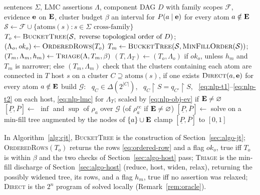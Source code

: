 \documentclass{article} %
\newcommand{\lo}{\underline}
\newcommand{\hi}{\overline}
\newcommand{\atoms}{\mathrm{atoms}}
\newcommand{\restr}{\!\restriction\!}
\newcommand{\readoff}{\rho}
\providecommand{\readoffcc}{\readoff^{\mathrm{cc}}}
\begin{document}
\begin{algorithm}[t]
\caption{\textsc{CJT}: marginal bounds at treewidth cost}
\label{alg:cjt}
\begin{algorithmic}[1]
\Require sentences $\Sigma$, LMC assertions $\Lambda$, component DAG $D$ with family
  scopes $\mathcal F$, evidence $\mathbf{e}$ on $\mathbf{E}$, cluster budget $\beta$
\Ensure an interval for $P(a\mid \mathbf{e})$ for every atom $a\notin\mathbf{E}$
\State $\mathcal S\gets\mathcal F\cup\{\atoms(s):s\in\Sigma\text{ cross-family}\}$
\State $T_o\gets\textsc{BucketTree}(\mathcal S,\ \text{reverse topological order of }D)$;
  \ $(\Lambda_o,\mathit{ok}_o)\gets\textsc{OrderedRows}(T_o)$ 
\State $T_m\gets\textsc{BucketTree}(\mathcal S,\textsc{MinFillOrder}(\mathcal S))$;
  \ $(T_m,\Lambda_m,h_m)\gets\textsc{Triage}(\Lambda,T_m,\beta)$ \Comment{\S\ref{sec:algo-host}}
\State $(T,\Lambda_T)\gets(T_o,\Lambda_o)$ if $\mathit{ok}_o$, unless $h_m$ and $T_m$ is
  narrower; else $(T_m,\Lambda_m)$
\State check that the clusters containing each atom are connected in $T$
  \Comment{[H1]}
  \State host $s$ on a cluster $C\supseteq\atoms(s)$, if one exists
\EndFor
{}
  \State \Return $\textsc{Direct}(a,\mathbf{e})$ for every atom $a\notin\mathbf{E}$
\EndIf
\State build $\mathcal G$: \ $q_C\in\Delta(2^{|C|})$,
  \ $q_C\restr S=q_{C'}\restr S$, \ \eqref{eq:nlp-t1}--\eqref{eq:nlp-t2}
  on each host, \eqref{eq:nlp-lmc} for $\Lambda_T$; scaled by \eqref{eq:nlp-obj-ev} if $\mathbf{E}\neq\varnothing$ 
    \State $[\lo P,\hi P]\gets$ $\inf$ and $\sup$ of $\readoff_a$ over $\mathcal G$ (of
      $\readoffcc_a$ if $\mathbf{E}\neq\varnothing$)
  \Else
    \State $[\lo P,\hi P]\gets$ solve on a min-fill tree augmented by the nodes of $\{a\}\cup\mathbf{E}$ 
  \EndIf
  \State clamp $[\lo P,\hi P]$ to $[0,1]$
\EndFor
\end{algorithmic}
\end{algorithm}

In Algorithm~\ref{alg:cjt}, \textsc{BucketTree} is the construction of
Section~\ref{sec:algo-jt}; \textsc{OrderedRows}$(T_o)$ returns the rows
\eqref{eq:ordered-row} and a flag $\mathit{ok}_o$, true iff $T_o$ is within $\beta$
and the two checks of Section~\ref{sec:algo-host} pass; \textsc{Triage} is the
min-fill discharge of Section~\ref{sec:algo-host} (reduce, host, widen, relax),
returning the possibly widened tree, its rows, and a flag $h_m$, true iff no
assertion was relaxed; \textsc{Direct} is the $2^n$ program of
\citet{marinescu2022neurips} solved locally (Remark~\ref{rem:oracle}).
\end{document}
